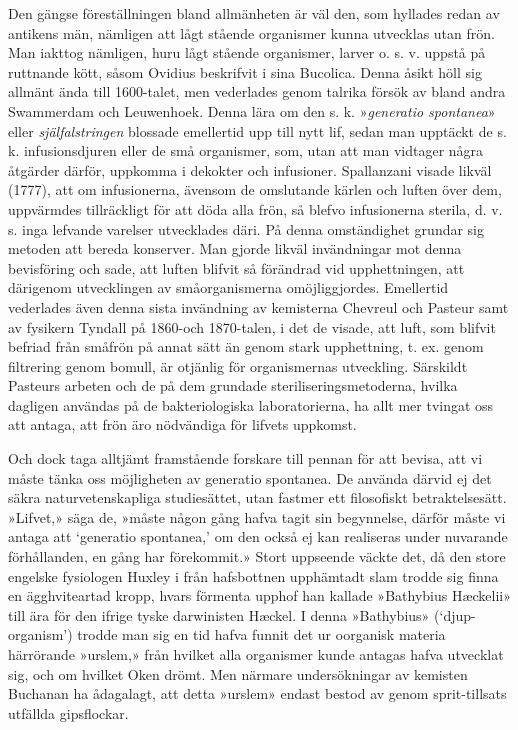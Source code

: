 \documentclass[a4paper, 12pt, oneside, swedish]{article}
\begin{document}
Den gängse föreställningen bland allmänheten är väl den, som hyllades redan av antikens män, nämligen att lågt stående organismer kunna utvecklas utan frön. Man iakttog nämligen, huru lågt stående organismer, larver o. s. v. uppstå på ruttnande kött, såsom Ovidius beskrifvit i sina Bucolica. Denna åsikt höll sig allmänt ända till 1600-talet, men vederlades genom talrika försök av bland andra Swammerdam och Leuwenhoek. Denna lära om den s. k. »\emph{generatio spontanea}» eller \emph{själfalstringen} blossade emellertid upp till nytt lif, sedan man upptäckt de s. k. infusionsdjuren eller de små organismer, som, utan att man vidtager några åtgärder därför, uppkomma i dekokter och infusioner. Spallanzani visade likväl (1777), att om infusionerna, ävensom de omslutande kärlen och luften över dem, uppvärmdes tillräckligt för att döda alla frön, så blefvo infusionerna sterila, d. v. s. inga lefvande varelser utvecklades däri. På denna omständighet grundar sig metoden att bereda konserver. Man gjorde likväl invändningar mot denna bevisföring och sade, att luften blifvit så förändrad vid upphettningen, att därigenom utvecklingen av småorganismerna omöjliggjordes. Emellertid vederlades även denna sista invändning av kemisterna Chevreul och Pasteur samt av fysikern Tyndall på 1860-och 1870-talen, i det de visade, att luft, som blifvit befriad från småfrön på annat sätt än genom stark upphettning, t. ex. genom filtrering genom bomull, är otjänlig för organismernas utveckling. Särskildt Pasteurs arbeten och de på dem grundade steriliseringsmetoderna, hvilka dagligen användas på de bakteriologiska laboratorierna, ha allt mer tvingat oss att antaga, att frön äro nödvändiga för lifvets uppkomst.

Och dock taga alltjämt framstående forskare till pennan för att bevisa, att vi måste tänka oss möjligheten av generatio spontanea. De använda därvid ej det säkra naturvetenskapliga studiesättet, utan fastmer ett filosofiskt betraktelsesätt. »Lifvet,» säga de, »måste någon gång hafva tagit sin begynnelse, därför måste vi antaga att `generatio spontanea,' om den också ej kan realiseras under nuvarande förhållanden, en gång har förekommit.» Stort uppseende väckte det, då den store engelske fysiologen Huxley i från hafsbottnen upphämtadt slam trodde sig finna en ägghviteartad kropp, hvars förmenta upphof han kallade »Bathybius Hæckelii» till ära för den ifrige tyske darwinisten Hæckel. I denna »Bathybius» (`djup-organism') trodde man sig en tid hafva funnit det ur oorganisk materia härrörande »urslem,» från hvilket alla organismer kunde antagas hafva utvecklat sig, och om hvilket Oken drömt. Men närmare undersökningar av kemisten Buchanan ha ådagalagt, att detta »urslem» endast bestod av genom sprit-tillsats utfällda gipsflockar.
\end{document}
